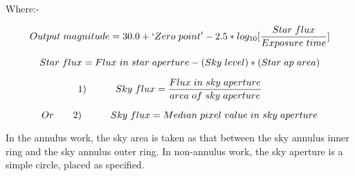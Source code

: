 \begin{small}
{{                          
   Where:-
                                                                              
   $$ Output{\hspace{0.3em}}magnitude = 30.0 + 
                                        `Zero{\hspace{0.3em}}point' - 
      2.5*log_{10}[\frac{Star{\hspace{0.3em}}flux}{Exposure{
      \hspace{0.3em}}time}] $$
                                                                              
$$   Star{\hspace{0.3em}}flux = Flux{\hspace{0.3em}}in{
         \hspace{0.3em}}star{\hspace{0.3em}}aperture - 
         (Sky{\hspace{0.3em}}level)*(Star{\hspace{0.3em}}ap{
         \hspace{0.3em}}area) $$

$$ {\hspace*{-2em}}     1) {\hspace*{3em}}   Sky{\hspace{0.3em}}flux  = 
         \frac{Flux{\hspace{0.3em}}in{\hspace{0.3em}}sky{
         \hspace{0.3em}}aperture}{area{\hspace{0.3em}}of{
         \hspace{0.3em}}sky{\hspace{0.3em}}aperture} $$

$$   Or {\hspace*{2em}}   2) {\hspace*{3em}} Sky{\hspace{0.3em}}flux  = 
     Median{\hspace{0.3em}}pixel{\hspace{0.3em}}value{
     \hspace{0.3em}}in{\hspace{0.3em}}sky{\hspace{0.3em}}aperture  $$
                                                                              
   In the annulus work, the sky area is taken as that between the
   sky annulus inner ring and the sky annulus outer ring.
   In non-annulus work, the sky aperture is a simple circle, placed
   as specified.
                                                                              
}}
\end{small}
